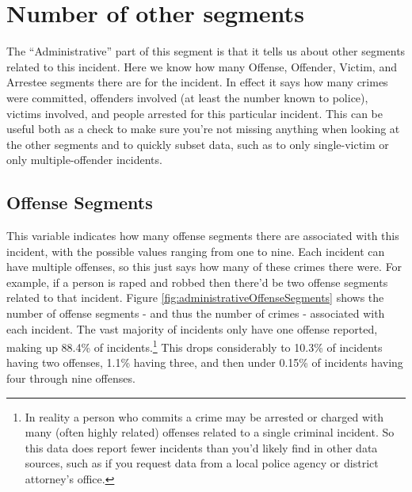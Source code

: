 \documentclass[
]{krantz}
\begin{document}
\section{Number of other
segments}\label{number-of-other-segments}

The ``Administrative'' part of this segment is that it tells
us about other segments related to this incident. Here we
know how many Offense, Offender, Victim, and Arrestee
segments there are for the incident. In effect it says how
many crimes were committed, offenders involved (at least the
number known to police), victims involved, and people
arrested for this particular incident. This can be useful
both as a check to make sure you're not missing anything
when looking at the other segments and to quickly subset
data, such as to only single-victim or only
multiple-offender incidents.

\subsection{Offense Segments}\label{offense-segments}

This variable indicates how many offense segments there are
associated with this incident, with the possible values
ranging from one to nine. Each incident can have multiple
offenses, so this just says how many of these crimes there
were. For example, if a person is raped and robbed then
there'd be two offense segments related to that incident.
Figure \ref{fig:administrativeOffenseSegments} shows the
number of offense segments - and thus the number of crimes -
associated with each incident. The vast majority of
incidents only have one offense reported, making up 88.4\%
of incidents.\footnote{In reality a person who commits a
  crime may be arrested or charged with many (often highly
  related) offenses related to a single criminal incident.
  So this data does report fewer incidents than you'd likely
  find in other data sources, such as if you request data
  from a local police agency or district attorney's office.}
This drops considerably to 10.3\% of incidents having two
offenses, 1.1\% having three, and then under 0.15\% of
incidents having four through nine offenses.
\end{document}
